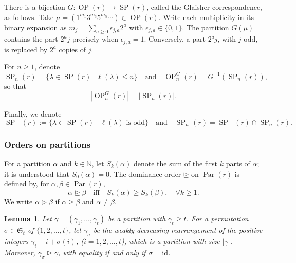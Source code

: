 \documentclass[11pt]{amsart}
\numberwithin{equation}{section}
\theoremstyle{plain}
\newtheorem{lem}[thm]{Lemma}
\theoremstyle{definition}
\theoremstyle{remark}
\begin{document}
There is a bijection $G:\operatorname{OP}(r)\to\operatorname{SP}(r)$,
called the Glaisher correspondence, as follows.
Take
$\mu=(1^{m_1}3^{m_3}5^{m_5}\cdots)\in\operatorname{OP}(r)$. Write each multiplicity in its binary expansion as $m_j=\sum_{a\geq0}\epsilon_{j,a}2^a$ with
$\epsilon_{j,a}\in\{0,1\}$. The partition $G(\mu)$ contains the
part $2^aj$ precisely when $\epsilon_{j,a}=1$. Conversely, a part
$2^{a}j$, with $j$ odd, is replaced by $2^a$ copies of $j$.

For $n\geq1$, denote
$$
\operatorname{SP}_n(r)
=\{\lambda\in\operatorname{SP}(r)~|~\ell(\lambda)\leq n\}
\quad \text{and} \quad
\operatorname{OP}_n^G(r)=G^{-1}(\operatorname{SP}_n(r)),
$$
so that
\begin{equation}\label{eq:q-index-card}
|\operatorname{OP}_n^G(r)|=|\operatorname{SP}_n(r)|.
\end{equation}

Finally, we denote
$$
\operatorname{SP}^{-}(r):=\{\lambda\in\operatorname{SP}(r)\mid
\ell(\lambda)\text{ is odd}\}\quad\text{and}\quad
\operatorname{SP}_n^{-}(r)
=\operatorname{SP}^{-}(r)\cap\operatorname{SP}_n(r).
$$




\subsubsection{Orders on partitions}
For a partition $\alpha$ and $k\in\mathbb{N}$, let $S_k(\alpha)$ denote the sum of the first $k$ parts of $\alpha$; it is understood that $S_0(\alpha)=0$. The  dominance order $\unrhd$ on $\operatorname{Par}(r)$ is defined by, for $\alpha,\beta\in\operatorname{Par}(r)$,
$$\alpha\unrhd\beta \quad\text{iff}\quad S_k(\alpha)\geq S_k(\beta), \quad \forall k\geq 1.
$$
We write $\alpha\triangleright\beta$ if $\alpha\unrhd\beta$ and
$\alpha\neq\beta$. 


\begin{lem}
\label{lem:perm-major}
Let $\gamma=(\gamma_1,\ldots,\gamma_t)$ be a partition with
$\gamma_t\geq t$.  For a permutation $\sigma\in\mathfrak S_t$ of $\{1,2,\ldots,t\}$, let $\gamma_\sigma$ be the  weakly decreasing rearrangement
of the positive integers $\gamma_i-i+\sigma(i)$, ($i=1,2,\ldots,t$), which is a partition with size $|\gamma|$. Moreover,
$\gamma_\sigma\unrhd\gamma$, with equality if and only if
$\sigma=\mathrm{id}$.
\end{lem}
\end{document}
